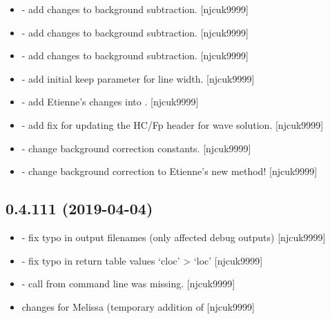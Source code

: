 \documentclass[a4paper,10pt,english]{report}
\begin{document}
\begin{itemize}
\item {} 
 - add changes to background subtraction.
{[}njcuk9999{]}

\item {} 
 - add changes to background subtraction.
{[}njcuk9999{]}

\item {} 
 - add changes to background subtraction.
{[}njcuk9999{]}

\item {} 
 - add initial keep parameter for line width. {[}njcuk9999{]}

\item {} 
 - add Etienne’s changes into
. {[}njcuk9999{]}

\item {} 
 - add fix for updating the HC/Fp header
for wave solution. {[}njcuk9999{]}

\item {} 
 - change background correction constants.
{[}njcuk9999{]}

\item {} 
 - change background correction to Etienne’s
new method! {[}njcuk9999{]}

\end{itemize}


\subsection{0.4.111 (2019-04-04)}
\label{\detokenize{misc/changelog:id150}}\begin{itemize}
\item {} 
 - fix typo in output filenames (only affected
debug outputs) {[}njcuk9999{]}

\item {} 
 - fix typo in return table values ‘cloc’ \textendash{}\textgreater{} ‘loc’
{[}njcuk9999{]}

\item {} 
 - call from command line was missing. {[}njcuk9999{]}

\item {} 
 changes for Melissa (temporary addition of
 {[}njcuk9999{]}

\end{itemize}
\end{document}
